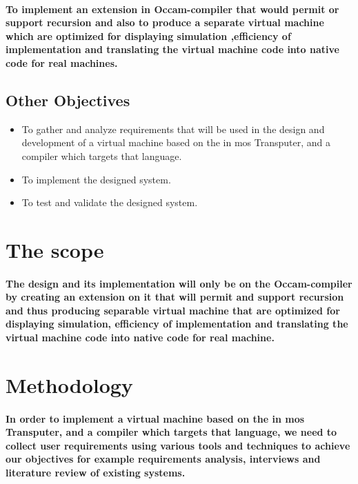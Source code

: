 \documentclass[dvips,12pt]{article}
\begin{document}
	\paragraph{To implement an extension in Occam-compiler that would permit or support recursion and also to produce  a separate virtual machine which are optimized for displaying simulation ,efficiency of implementation and translating the virtual machine code into native code for real machines.}
	
	\subsection{Other Objectives}
	
	\begin{itemize}
	 \item
	 To gather and analyze requirements that will be used in the design and development of a virtual machine based on the in mos Transputer, and a compiler which targets that language.
	 \item
	  To implement the designed system.
	  \item
	   To test and validate the designed system.
	 \end{itemize} 
	
	\section{The scope }
	\paragraph{The design and its implementation will only be on the Occam-compiler by creating an extension on it that will permit and support recursion and thus producing separable virtual machine that are optimized for displaying simulation, efficiency of implementation and translating the virtual machine code into native code for real machine.}
	
	\section{Methodology}
	\paragraph{In order to  implement a virtual machine based on the in mos Transputer, and a compiler which targets that language, we need to collect user requirements using various tools and techniques to achieve our objectives for example requirements analysis, interviews and literature review of existing systems.}
	
\end{document}

